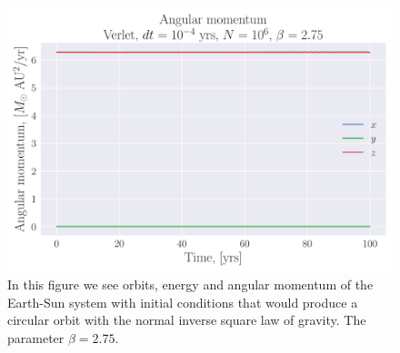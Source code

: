 \documentclass[reprint, english,notitlepage,nofootinbib]{revtex4-1}  %
\begin{document}
\begin{figure}[h]
  \includegraphics[width=\linewidth]{../output/earth_sun_circ-verlet-4-6-2_75_ang_mom.pdf}
	\caption{In this figure we see orbits, energy and angular momentum of the Earth-Sun system with initial conditions that would produce a circular orbit with the normal inverse square law of gravity. The parameter $\beta = 2.75$.}
	\label{fig:earth_sun_circ_beta=2_75}
\end{figure}
\end{document}
